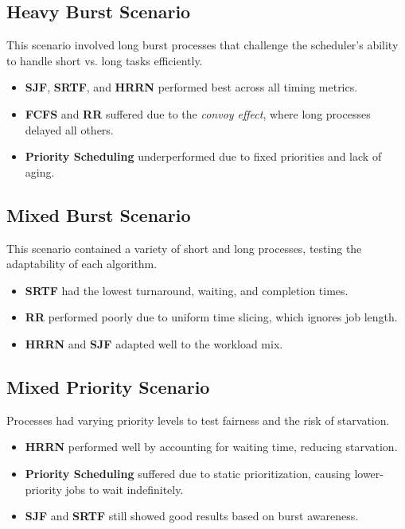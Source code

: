 \documentclass[conference]{report}
\begin{document}
\subsection*{Heavy Burst Scenario}
This scenario involved long burst processes that challenge the scheduler’s ability to handle short vs. long tasks efficiently.

\begin{itemize}
    \item \textbf{SJF}, \textbf{SRTF}, and \textbf{HRRN} performed best across all timing metrics.
    \item \textbf{FCFS} and \textbf{RR} suffered due to the \textit{convoy effect}, where long processes delayed all others.
    \item \textbf{Priority Scheduling} underperformed due to fixed priorities and lack of aging.
\end{itemize}

\subsection*{Mixed Burst Scenario}
This scenario contained a variety of short and long processes, testing the adaptability of each algorithm.

\begin{itemize}
    \item \textbf{SRTF} had the lowest turnaround, waiting, and completion times.
    \item \textbf{RR} performed poorly due to uniform time slicing, which ignores job length.
    \item \textbf{HRRN} and \textbf{SJF} adapted well to the workload mix.
\end{itemize}

\subsection*{Mixed Priority Scenario}
Processes had varying priority levels to test fairness and the risk of starvation.

\begin{itemize}
    \item \textbf{HRRN} performed well by accounting for waiting time, reducing starvation.
    \item \textbf{Priority Scheduling} suffered due to static prioritization, causing lower-priority jobs to wait indefinitely.
    \item \textbf{SJF} and \textbf{SRTF} still showed good results based on burst awareness.
\end{itemize}
\end{document}
